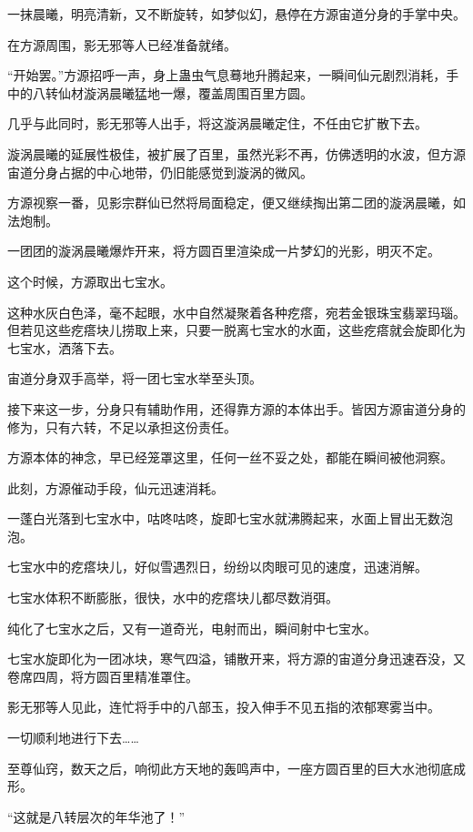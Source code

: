 
\begin{this_body}

一抹晨曦，明亮清新，又不断旋转，如梦似幻，悬停在方源宙道分身的手掌中央。

在方源周围，影无邪等人已经准备就绪。

“开始罢。”方源招呼一声，身上蛊虫气息蓦地升腾起来，一瞬间仙元剧烈消耗，手中的八转仙材漩涡晨曦猛地一爆，覆盖周围百里方圆。

几乎与此同时，影无邪等人出手，将这漩涡晨曦定住，不任由它扩散下去。

漩涡晨曦的延展性极佳，被扩展了百里，虽然光彩不再，仿佛透明的水波，但方源宙道分身占据的中心地带，仍旧能感觉到漩涡的微风。

方源视察一番，见影宗群仙已然将局面稳定，便又继续掏出第二团的漩涡晨曦，如法炮制。

一团团的漩涡晨曦爆炸开来，将方圆百里渲染成一片梦幻的光影，明灭不定。

这个时候，方源取出七宝水。

这种水灰白色泽，毫不起眼，水中自然凝聚着各种疙瘩，宛若金银珠宝翡翠玛瑙。但若见这些疙瘩块儿捞取上来，只要一脱离七宝水的水面，这些疙瘩就会旋即化为七宝水，洒落下去。

宙道分身双手高举，将一团七宝水举至头顶。

接下来这一步，分身只有辅助作用，还得靠方源的本体出手。皆因方源宙道分身的修为，只有六转，不足以承担这份责任。

方源本体的神念，早已经笼罩这里，任何一丝不妥之处，都能在瞬间被他洞察。

此刻，方源催动手段，仙元迅速消耗。

一蓬白光落到七宝水中，咕咚咕咚，旋即七宝水就沸腾起来，水面上冒出无数泡泡。

七宝水中的疙瘩块儿，好似雪遇烈日，纷纷以肉眼可见的速度，迅速消解。

七宝水体积不断膨胀，很快，水中的疙瘩块儿都尽数消弭。

纯化了七宝水之后，又有一道奇光，电射而出，瞬间射中七宝水。

七宝水旋即化为一团冰块，寒气四溢，铺散开来，将方源的宙道分身迅速吞没，又卷席四周，将方圆百里精准罩住。

影无邪等人见此，连忙将手中的八部玉，投入伸手不见五指的浓郁寒雾当中。

一切顺利地进行下去……

至尊仙窍，数天之后，响彻此方天地的轰鸣声中，一座方圆百里的巨大水池彻底成形。

“这就是八转层次的年华池了！”


\end{this_body}
